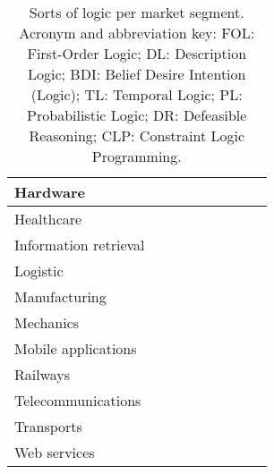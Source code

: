 \begin{table}
{\begin{tabular}{l||c|c|c|c|c|c|c|c}
            Hardware                    &     & \cite{lenat1995-cyc} &     &    & \cite{costa1995,bolognani1998}   &    &    & \cite{JaffarM94} \\ \hline
            Healthcare                  &     &    & \cite{Leitao2016,Croatti2019} & \cite{Holzmann97} & \cite{abbod2001,yuan2012}   &    &    &     \\ \hline
            Information retrieval       &     & \cite{horrocks2005} &     &    & \cite{gupta2015,horng2005}   &    &    &     \\ \hline
            Logistic                    & \cite{Carlsson2012} & \cite{lenat1995-cyc} & \cite{Leitao2016,Winikoff2005} & \cite{Holzmann97} &    &    &    & \cite{JaffarM94} \\ \hline
            Manufacturing               &     &    & \cite{Leitao2016,Winikoff2005} & \cite{Holzmann97} & \cite{azadegan2011,lin2005}
            &    &    &     \\ \hline
            Mechanics                   &     &    &     &    &    &    &    & \cite{JaffarM94} \\ \hline
            Mobile applications         &     &    &     & \cite{KohanYAYMHT16,MartinelliMN18} &    &    &    &     \\ \hline
            Railways                    &     &    &     & \cite{Wu17b} & \cite{sezer2011,skarlatos2004}  &    &    &     \\ \hline
            Telecommunications          & \cite{Carlsson2012} &    &     &    & \cite{ghosh1998,catania1996}   & \cite{KwiatkowskaNP02} &    & \cite{JaffarM94} \\ \hline
            Transports                  &     &    & \cite{Leitao2016} &    & \cite{sarkar2012,quddus2006}   &    &    &     \\ \hline
            Web services                &     & \cite{yang2003-flora,horrocks2005} &     & \cite{DoniniMRT06, ArtziKDTDPE10} & \cite{tran2008,chao2005}   &    &    &     \\ \hline
        \end{tabular}
    }
    \caption{Sorts of logic per market segment. Acronym and abbreviation key: FOL: First-Order Logic; DL: Description Logic; BDI: Belief Desire Intention (Logic); TL: Temporal Logic; PL: Probabilistic Logic; DR: Defeasible Reasoning; CLP: Constraint Logic Programming.}
    \label{tab:logic-segments}
\end{table}
%
